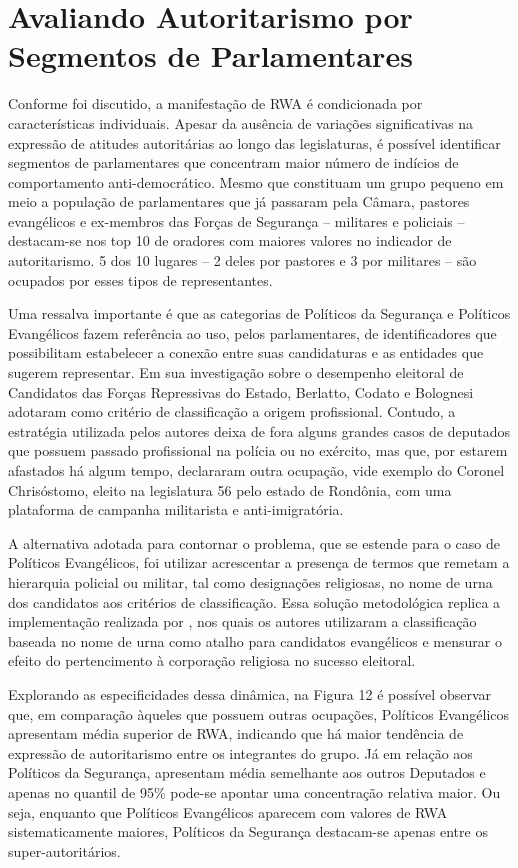 \documentclass[
12pt,				%
openright,			%
twoside,			%
a4paper,			%
english,			%
french,				%
spanish,			%
brazil				%
]{abntex2}
\begin{document}
\section{Avaliando Autoritarismo por Segmentos de Parlamentares}

Conforme foi discutido, a manifestação de RWA é condicionada por características individuais. Apesar da ausência de variações significativas na expressão de atitudes autoritárias ao longo das legislaturas, é possível identificar segmentos de parlamentares que concentram maior número de indícios de comportamento anti-democrático. Mesmo que constituam um grupo pequeno em meio a população de parlamentares que já passaram pela Câmara, pastores evangélicos e ex-membros das Forças de Segurança -- militares e policiais -- destacam-se nos top 10 de oradores com maiores valores no indicador de autoritarismo. 5 dos 10 lugares -- 2 deles por pastores e 3 por militares -- são ocupados por esses tipos de representantes.

Uma ressalva importante é que as categorias de Políticos da Segurança e Políticos Evangélicos fazem referência ao uso, pelos parlamentares, de identificadores que possibilitam estabelecer a conexão entre suas candidaturas e as entidades que sugerem representar. Em sua investigação sobre o desempenho eleitoral de Candidatos das Forças Repressivas do Estado, Berlatto, Codato e Bolognesi
 adotaram como critério de classificação a origem profissional. Contudo, a estratégia utilizada pelos autores deixa de fora alguns grandes casos de deputados que possuem passado profissional na polícia ou no exército, mas que, por estarem afastados há algum tempo, declararam outra ocupação, vide exemplo do Coronel Chrisóstomo, eleito na legislatura 56 pelo estado de Rondônia, com uma plataforma de campanha militarista e anti-imigratória.

A alternativa adotada para contornar o problema, que se estende para o caso de Políticos Evangélicos, foi utilizar acrescentar a presença de termos que remetam a hierarquia policial ou militar, tal como designações religiosas, no nome de urna dos candidatos aos critérios de classificação. Essa solução metodológica replica a implementação realizada por , nos quais os autores utilizaram a classificação baseada no nome de urna como atalho para candidatos evangélicos e mensurar o efeito do pertencimento à corporação religiosa no sucesso eleitoral.

Explorando as especificidades dessa dinâmica, na Figura 12 é possível observar que, em comparação àqueles que possuem outras ocupações, Políticos Evangélicos apresentam média superior de RWA, indicando que há maior tendência de expressão de autoritarismo entre os integrantes do grupo. Já em relação aos Políticos da Segurança, apresentam média semelhante aos outros Deputados e apenas no quantil de 95{\%} pode-se apontar uma concentração relativa maior. Ou seja, enquanto que Políticos Evangélicos aparecem com valores de RWA sistematicamente maiores, Políticos da Segurança destacam-se apenas entre os super-autoritários.   
\end{document}
